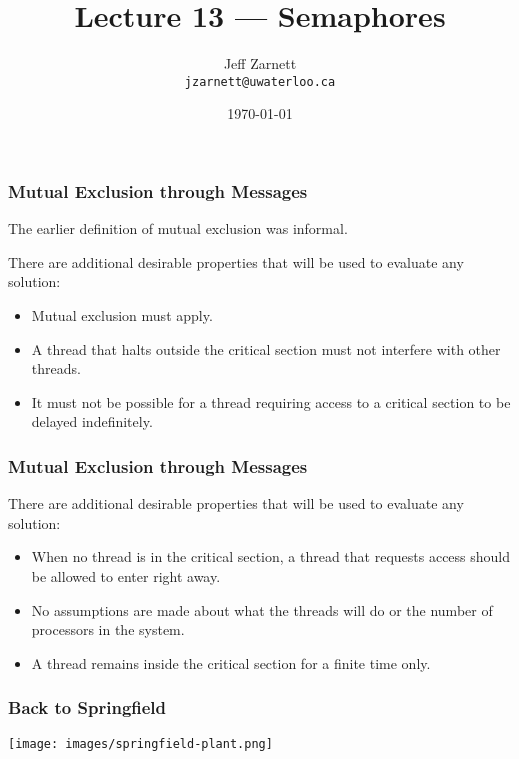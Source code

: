 

\title{Lecture 13 --- Semaphores }

\author{Jeff Zarnett \\ \small \texttt{jzarnett@uwaterloo.ca}}
\date{\today}




\begin{frame}
	\titlepage

\end{frame}

\begin{frame}
	\frametitle{Mutual Exclusion through Messages}

	The earlier definition of mutual exclusion was informal.

	There are additional desirable properties that will be used to evaluate any solution:
	\begin{itemize}
		\item Mutual exclusion must apply.
		\item A thread that halts outside the critical section must not interfere with other threads.
		\item It must not be possible for a thread requiring access to a critical section to be delayed indefinitely.
	\end{itemize}
\end{frame}

\begin{frame}
	\frametitle{Mutual Exclusion through Messages}
	There are additional desirable properties that will be used to evaluate any solution:
	\begin{itemize}
		\item When no thread is in the critical section, a thread that requests access should be allowed to enter right away.
		\item No assumptions are made about what the threads will do or the number of processors in the system.
		\item A thread remains inside the critical section for a finite time only.
	\end{itemize}


\end{frame}


\begin{frame}
	\frametitle{Back to Springfield}

	\begin{center}
		\texttt{[image: images/springfield-plant.png]}
	\end{center}


\end{frame}


